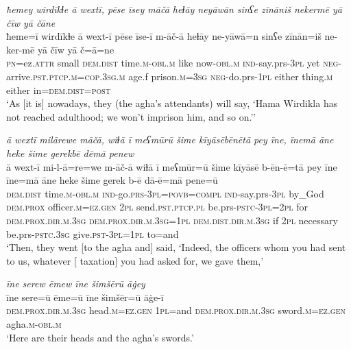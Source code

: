 \ea \label{BP.123}
\textit{ħemey wirdīkɫe ā wextī, pēse īsey māčā heɫāy neyāwān sinʕe zīnāniš nekermē yā čīw yā čāne} \\ 
\gll ħeme=ī wirdīkɫe ā wext-ī pēse īse-ī m-āč-ā heɫāy ne-yāwā=n sinʕe zīnān=iš ne-ker-mē yā čīw yā č=ā=ne \\ 
 \textsc{pn}=ez.\textsc{attr} small \textsc{dem.dist} time\textsc{.m}\textsc{-obl}\textsc{.m} like now\textsc{-obl}\textsc{.m} \textsc{ind-}say.prs\textsc{-3pl} yet \textsc{neg-}arrive\textsc{.pst}\textsc{.ptcp}\textsc{.m}\textsc{=cop}\textsc{.3sg}\textsc{.m} age.f prison\textsc{.m}\textsc{=3sg} \textsc{neg-}do.prs\textsc{-\textsc{1pl}} either thing\textsc{.m} either in=\textsc{dem.dist}\textsc{=\textsc{post}} \\ 
\glt `As [it is] nowadays, they (the agha’s attendants) will say, ‘Hama Wirdikla has not reached adulthood; we won’t imprison him, and so on.’'
\z 
 
\ea \label{BP.124}
\textit{ā wextī milārewe māčā, wiɫā ī meʕmūrū šime kīyāsēbēnētā pey īne, īnemā āne heke šime gerekbē dēmā penew} \\ 
\gll ā wext-ī mi-l-ā=re=we m-āč-ā wiɫā ī meʕmūr=ū šime kīyāsē b-ēn-ē=tā pey īne īne=mā āne heke šime gerek b-ē dā-ē=mā pene=ū \\ 
 \textsc{dem.dist} time\textsc{.m}\textsc{-obl}\textsc{.m} \textsc{ind-}go.\textsc{prs}\textsc{-3pl}\textsc{=\textsc{povb}}\textsc{=compl} \textsc{ind-}say.prs\textsc{-3pl} by\_God \textsc{dem.prox} officer\textsc{.m}\textsc{=ez.gen} \textsc{2pl} send\textsc{.pst}\textsc{.ptcp}\textsc{.pl} be.prs\textsc{-pstc}\textsc{-3pl}=\textsc{2pl} for \textsc{dem.prox}\textsc{.dir}\textsc{.m}\textsc{.3sg} \textsc{dem.prox}\textsc{.dir}\textsc{.m}\textsc{.3sg}\textsc{=\textsc{1pl}} \textsc{dem.dist}\textsc{.dir}\textsc{.m}\textsc{.3sg} if \textsc{2pl} necessary be.prs\textsc{-pstc}\textsc{.3sg} give\textsc{.pst}\textsc{-3pl}\textsc{=\textsc{1pl}} to=and \\ 
\glt `Then, they went [to the agha and] said, ‘Indeed, the officers whom you had sent to us, whatever [ taxation] you had asked for, we gave them,'
\z 
 
\ea \label{BP.128}
\textit{īne serew ēmew īne šimšērū āġey} \\ 
\gll īne sere=ū ēme=ū īne šimšēr=ū āġe-ī \\ 
 \textsc{dem.prox}\textsc{.dir}\textsc{.m}\textsc{.3sg} head\textsc{.m}\textsc{=ez.gen} \textsc{1pl}=and \textsc{dem.prox}\textsc{.dir}\textsc{.m}\textsc{.3sg} sword\textsc{.m}\textsc{=ez.gen} agha\textsc{.m}\textsc{-obl}\textsc{.m} \\ 
\glt `Here are their heads and the agha’s swords.'
\z 
 
